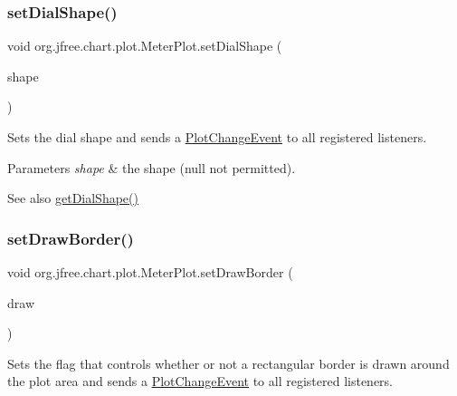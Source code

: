 \subsubsection{\texorpdfstring{set\+Dial\+Shape()}{setDialShape()}}
{\footnotesize\ttfamily void org.\+jfree.\+chart.\+plot.\+Meter\+Plot.\+set\+Dial\+Shape (\begin{DoxyParamCaption}\item[{\mbox{\hyperlink{classorg_1_1jfree_1_1chart_1_1plot_1_1_dial_shape}{Dial\+Shape}}}]{shape }\end{DoxyParamCaption})}

Sets the dial shape and sends a \mbox{\hyperlink{}{Plot\+Change\+Event}} to all registered listeners.


\begin{DoxyParams}{Parameters}
{\em shape} & the shape ({\ttfamily null} not permitted).\\
\hline
\end{DoxyParams}
\begin{DoxySeeAlso}{See also}
\mbox{\hyperlink{classorg_1_1jfree_1_1chart_1_1plot_1_1_meter_plot_a0e92b5cd1947bd12216f1695acd5f65e}{get\+Dial\+Shape()}} 
\end{DoxySeeAlso}
\mbox{\label{classorg_1_1jfree_1_1chart_1_1plot_1_1_meter_plot_a4926421a84350958e8e7cf40f25f2e4a}} 
\subsubsection{\texorpdfstring{set\+Draw\+Border()}{setDrawBorder()}}
{\footnotesize\ttfamily void org.\+jfree.\+chart.\+plot.\+Meter\+Plot.\+set\+Draw\+Border (\begin{DoxyParamCaption}\item[{boolean}]{draw }\end{DoxyParamCaption})}

Sets the flag that controls whether or not a rectangular border is drawn around the plot area and sends a \mbox{\hyperlink{}{Plot\+Change\+Event}} to all registered listeners.


